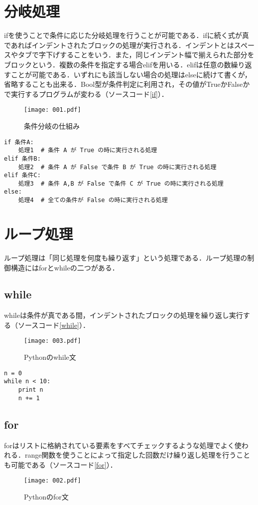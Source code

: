 \section{分岐処理}
ifを使うことで条件に応じた分岐処理を行うことが可能である．ifに続く式が真であればインデントされたブロックの処理が実行される．インデントとはスペースやタブで字下げすることをいう．また，同じインデント幅で揃えられた部分をブロックという．複数の条件を指定する場合elifを用いる．elifは任意の数繰り返すことが可能である．いずれにも該当しない場合の処理はelseに続けて書くが，省略することも出来る．Bool型が条件判定に利用され，その値がTrueかFalseかで実行するプログラムが変わる（ソースコード\ref{if}）．
\begin{figure}[h]
 \centering
  \texttt{[image: 001.pdf]}
  \caption{条件分岐の仕組み}
\end{figure}
\begin{lstlisting}[caption=ifの使い方,label=if]
if 条件A:
    処理1  # 条件 A が True の時に実行される処理
elif 条件B:
    処理2  # 条件 A が False で条件 B が True の時に実行される処理
elif 条件C:
    処理3  # 条件 A,B が False で条件 C が True の時に実行される処理
else:
    処理4  # 全ての条件が False の時に実行される処理
\end{lstlisting}

\section{ループ処理}
ループ処理は「同じ処理を何度も繰り返す」という処理である．ループ処理の制御構造にはforとwhileの二つがある．
\subsection{while}
whileは条件が真である間，インデントされたブロックの処理を繰り返し実行する（ソースコード\ref{while}）．
\begin{figure}[h]
 \centering
  \texttt{[image: 003.pdf]}
  \caption{Pythonのwhile文}
  \label{scale}
\end{figure}

\begin{lstlisting}[caption=whileの使い方, label=while]
n = 0
while n < 10:
	print n
	n += 1
\end{lstlisting}

\subsection{for}
forはリストに格納されている要素をすべてチェックするような処理でよく使われる．range関数を使うことによって指定した回数だけ繰り返し処理を行うことも可能である（ソースコード\ref{for}）．
\begin{figure}[h]
 \centering
  \texttt{[image: 002.pdf]}
  \caption{Pythonのfor文}
\end{figure}

